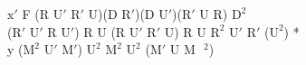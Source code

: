 $\text{x}'$ F (R $\text{U}'$ $\text{R}'$ U)(D $\text{R}'$)(D $\text{U}'$)($\text{R}'$ U R) $\text{D}^2$\\
($\text{R}'$ $\text{U}'$ R $\text{U}'$) R U (R $\text{U}'$ $\text{R}'$ U) R U $\text{R}^2$ $\text{U}'$ $\text{R}'$ ($\text{U}^2$) *\\
y ($\text{M}^2$ $\text{U}'$ $\text{M}'$) $\text{U}^2$ $\text{M}^2$ $\text{U}^2$ ($\text{M}'$ U M$\text{ }^2$)\\
